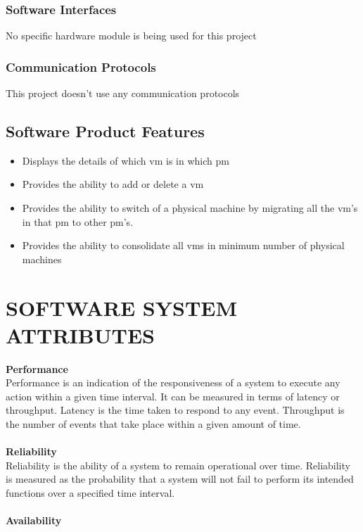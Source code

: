 \documentclass[a4paper,11pt]{article}
\begin{document}
			\subsubsection{Software Interfaces}
			No specific hardware module is being used for this project 
			\subsubsection{Communication Protocols}
			This project doesn’t use any communication protocols
		\subsection{Software Product Features}
			\begin{itemize}
				\item Displays the details of which vm is in which pm
				\item Provides the ability to add or delete a vm
				\item Provides the ability to switch of a physical machine by migrating all the 
				vm’s in that pm to other pm’s.
				\item Provides the ability to consolidate all vms in minimum number of physical machines

			\end{itemize}
			
	\section{SOFTWARE SYSTEM ATTRIBUTES}

	  {\bf Performance}
	  \\	  
	  
	    Performance is an indication of the responsiveness of a system to execute any action within a 
	    given time interval. It can be measured in terms of latency or throughput. Latency is the time 
	    taken to respond to any event. Throughput is the number of events that take place within a given amount of time.
	    \\\\	    
	 {\bf Reliability}
	 \\
	  
	    Reliability is the ability of a system to remain operational over time. Reliability is measured as 
	    the probability that a system will not fail to perform its intended functions over a specified time interval.
	    \\\\	
	  {\bf Availability}
	  \\
	  
\end{document}
